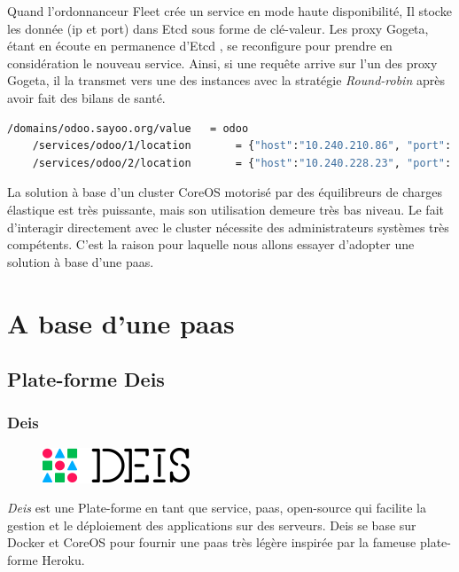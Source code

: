 \begin{onehalfspace}
Quand l'ordonnanceur Fleet crée un service en mode haute disponibilité, Il stocke les donnée (\acrshort{ip} et port) dans Etcd sous forme de clé-valeur. Les proxy Gogeta, étant en écoute en permanence d'Etcd , se reconfigure pour prendre en considération le nouveau service. Ainsi, si une requête arrive sur l'un des proxy Gogeta, il la transmet vers une des instances avec la stratégie \emph{Round-robin} après avoir fait des bilans de santé.

\begin{lstlisting}[language=bash,caption=Contenu de la base de donnée Etcd]
	/domains/odoo.sayoo.org/value 	= odoo
	/services/odoo/1/location		= {"host":"10.240.210.86", "port": 42654}
	/services/odoo/2/location		= {"host":"10.240.228.23", "port": 42669}
\end{lstlisting}


La solution à base d'un cluster CoreOS motorisé par des équilibreurs de charges élastique est très puissante, mais son utilisation demeure très bas niveau. Le fait d’interagir directement avec le cluster nécessite des administrateurs systèmes très compétents. C'est la raison pour laquelle nous allons essayer d'adopter une solution à base d'une \acrshort{paas}.


\section{A base d'une \acrshort{paas}}
\subsection{Plate-forme Deis}

\subsubsection*{Deis}

\begin{figure}
\centering
\includegraphics[scale=0.4]{chapitre5/assets/deis}
\end{figure}
\noindent \emph{Deis} est une Plate-forme en tant que service, \acrshort{paas}, open-source qui facilite la gestion et le déploiement des applications sur des serveurs. Deis se base sur Docker et CoreOS pour fournir une \acrshort{paas} très légère inspirée par la fameuse plate-forme Heroku.



\end{onehalfspace}
